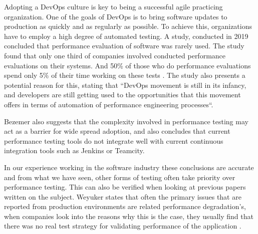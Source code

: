 Adopting a DevOps culture is key to being a successful agile practicing organization. One of the goals of DevOps is to bring software updates to production as quickly and as regularly as possible. To achieve this, organizations have to employ a high degree of automated testing. A study, conducted in 2019 concluded that performance evaluation of software was rarely used. The study found that only one third of companies involved conducted performance evaluations on their systems. And 50\% of those who do performance evaluations spend only 5\% of their time working on these tests \cite{bezemer2019performance}. The study also presents a potential reason for this, stating that ``DevOps movement is
still in its infancy, and developers are still getting used to the opportunities that this movement offers in terms of automation of
performance engineering processes``.

Bezemer also suggests that the complexity involved in performance testing may act as a barrier for wide spread adoption, and also concludes that current performance testing tools do not integrate well with current continuous integration tools such as Jenkins or Teamcity.

In our experience working in the software industry these conclusions are accurate and from what we have seen, other forms of testing often take priority over performance testing. This can also be verified when looking at previous papers written on the subject. Weyuker states that often the primary issues that are reported from production environments are related performance degradation's, when companies look into the reasons why this is the case, they usually find that there was no real test strategy for validating performance of the application \cite{888628}. 